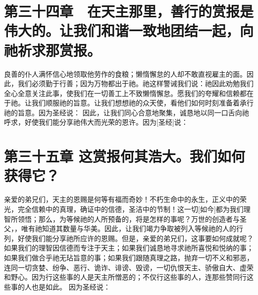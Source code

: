 
\section{第三十四章　在天主那里，善行的赏报是伟大的。让我们和谐一致地团结一起，向祂祈求那赏报。}

良善的仆人满怀信心地领取他劳作的食粮；懒惰懈怠的人却不敢直视雇主的面。因此，我们必须勤于行善；因为万物都出于祂。祂这样警诫我们说：祂因此劝勉我们全心全意关注此事，使我们在一切善工上不致懒惰懈怠。愿我们的夸耀和信赖都在于祂。让我们顺服祂的旨意。让我们想想祂的众天使，看他们如何时刻准备着承行祂的旨意。因为圣经说： 因此，让我们同心合意地聚集，诚恳地以同一口舌向祂呼求，好使我们能分享祂伟大而光荣的恩许。因为[圣经]说：\par


\section{第三十五章 这赏报何其浩大。我们如何获得它？}

亲爱的弟兄们，天主的恩赐是何等有福而奇妙！不朽生命中的永生，正义中的荣光，完全信赖中的真理，确证中的信德，圣洁中的节制！这一切[如今]都为我们理智所领悟；那么，为等候祂的人所预备的，将是怎样的事呢？万世的创造者与圣父，，唯有祂知道其数量与华美。因此，让我们竭力争取被列入等候祂的人的行列，好使我们能分享祂所应许的恩赐。但是，亲爱的弟兄们，这事要如何成就呢？如果我们的理智因信德而专注于天主；如果我们诚恳地寻求祂所喜悦和悦纳的事；如果我们做合乎祂无玷旨意的事；如果我们跟随真理之路，抛弃一切不义和邪恶，连同一切贪婪、纷争、恶行、诡诈、诽谤、毁谤，一切仇恨天主、骄傲自大、虚荣和野心。因为行这些事的人是天主所憎恶的；不仅行这些事的人，连那些赞同行这些事的人也是如此。 因为圣经说：\par

